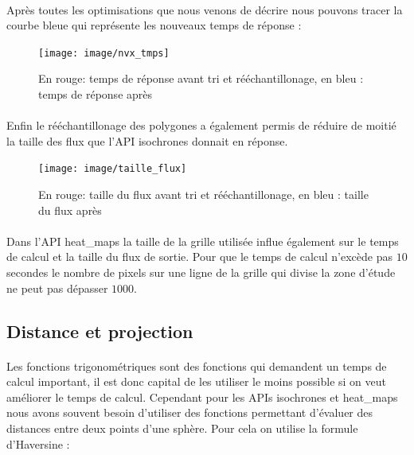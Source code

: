 \documentclass[a4paper]{report}
\begin{document}
\paragraph{} Après toutes les optimisations que nous venons de décrire nous pouvons tracer la courbe bleue qui représente les nouveaux temps de réponse :

\begin{figure}[H]
	\begin{center}
		\texttt{[image: image/nvx\_tmps]}
		\caption{En rouge: temps de réponse avant tri et rééchantillonage, en bleu : temps de réponse après}
		\label{Temps de réponse après tri et rééchantillonnage}
	\end{center}
\end{figure}

\paragraph{} Enfin le rééchantillonage des polygones a également permis de réduire de moitié la taille des flux que l'API isochrones donnait en réponse.

\begin{figure}[H]
	\begin{center}
		\texttt{[image: image/taille\_flux]}
		\caption{En rouge: taille du flux avant tri et rééchantillonage, en bleu : taille du flux après}
		\label{Taille du flux après tri et rééchantillonnage}
	\end{center}
\end{figure}

\paragraph{} Dans l'API heat\_maps la taille de la grille utilisée influe également sur le temps de calcul et la taille du flux de sortie. Pour que le temps de calcul n'excède pas $10$ secondes le nombre de pixels sur une ligne de la grille qui divise la zone d'étude ne peut pas dépasser $1000$.

\subsection{Distance et projection}

\paragraph{} Les fonctions trigonométriques sont des fonctions qui demandent un temps de calcul important, il est donc capital de les utiliser le moins possible si on veut améliorer le temps de calcul. Cependant pour les APIs isochrones et heat\_maps nous avons souvent besoin d'utiliser des fonctions permettant d'évaluer des distances entre deux points d'une sphère. Pour cela on utilise la formule d'Haversine :
\end{document}
